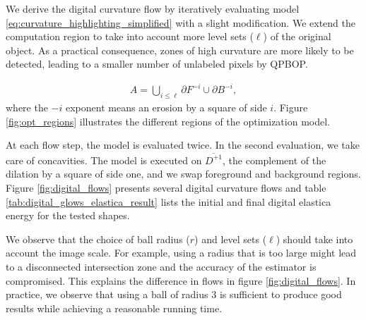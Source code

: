 \documentclass[runningheads]{llncs}
\begin{document}
We derive the digital curvature flow by iteratively evaluating model \eqref{eq:curvature_highlighting_simplified} with a
slight modification. We extend the computation region to take into account more level sets ($\ell$) of the original object. As a
practical consequence, zones of high curvature are more likely to be detected, leading to a smaller number of unlabeled
pixels by QPBOP.

\begin{align*}
	A = \bigcup_{i\leq \ell}{ \partial F^{-i} \cup \partial B^{-i} },
\end{align*}
where the $-i$ exponent means an erosion by a square of side $i$. Figure \ref{fig:opt_regions} illustrates the different regions of the optimization model. 

At each flow step, the model is evaluated twice. In the second evaluation, we take care of concavities. The model is
executed on $\overline{D^{+1}}$, the complement of the dilation by a square of side one, and we swap foreground and
background regions. Figure \ref{fig:digital_flows} presents several digital curvature flows and table \ref{tab:digital_glows_elastica_result} lists the initial and final digital elastica energy for the tested shapes.

We observe that the choice of ball radius ($r$) and level sets ($\ell$) should take into account the image scale. For example, using a
radius that is too large might lead to a disconnected intersection zone and the accuracy of the estimator is compromised. This
explains the difference in flows in figure \ref{fig:digital_flows}. In practice, we observe that using a ball of radius
$3$ is sufficient to produce good results while achieving a reasonable running time.
\end{document}
